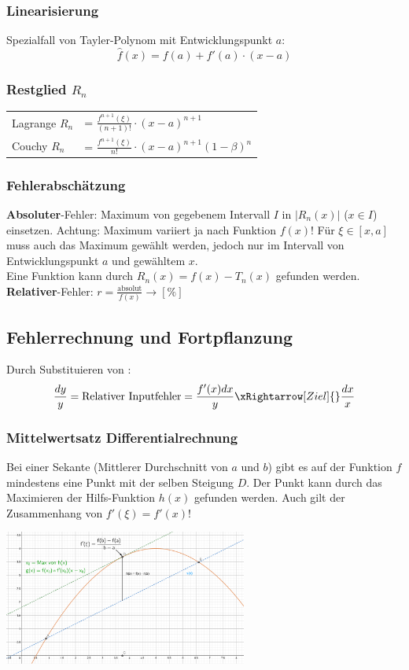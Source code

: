 \subsubsection{Linearisierung}
Spezialfall von Tayler-Polynom mit Entwicklungspunkt $a$:
\[\hat{f}(x) = f(a) + f'(a)\cdot(x - a)\]

\subsubsection{Restglied $R_n$}
\begin{tabular}{ll}
	Lagrange $R_n$ &= $\frac{f^{n + 1}(\xi)}{(n + 1)!} \cdot (x - a)^{n+1}$\\
	Couchy $R_n$ &= $\frac{f^{n + 1}(\xi)}{n!} \cdot (x - a)^{n+1} (1 - \beta)^n$
\end{tabular}


\subsubsection{Fehlerabschätzung}
\textbf{Absoluter}-Fehler: Maximum von gegebenem Intervall $I$ in $\left|R_n(x)\right|$ ($x \in I$) einsetzen. Achtung: Maximum variiert ja nach Funktion $f(x)$! Für $\xi \in [x, a]$ muss auch das Maximum gewählt werden, jedoch nur im Intervall von Entwicklungspunkt $a$ und gewähltem $x$.\\

\noindent Eine Funktion kann durch $R_n(x) = f(x) - T_n(x)$ gefunden werden.\\

\noindent\textbf{Relativer}-Fehler: $r = \frac{\text{absolut}}{f(x)} \rightarrow [\%]$

\subsection{Fehlerrechnung und Fortpflanzung}
Durch Substituieren von :
\[
\dfrac{dy}{y} = \text{Relativer Inputfehler} = \dfrac{f'(x)dx}{y} \xRightarrow[Ziel]{}\dfrac{dx}{x}
\]

\subsubsection{Mittelwertsatz Differentialrechnung}
Bei einer Sekante (Mittlerer Durchschnitt von $a$ und $b$) gibt es auf der Funktion $f$ mindestens eine Punkt mit der selben Steigung $D$. Der Punkt kann durch das Maximieren der Hilfs-Funktion $h(x)$ gefunden werden. Auch gilt der Zusammenhang von $f'(\xi) = f'(x)$!
\begin{center}
	\includegraphics[height=12em]{./Images/Mittelwertsatz.png}
\end{center}

